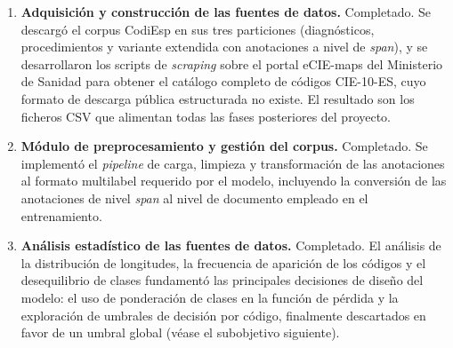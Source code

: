 \begin{enumerate}
 \item \textbf{Adquisición y construcción de las fuentes de datos.} Completado. Se descargó el corpus CodiEsp en sus tres particiones (diagnósticos, procedimientos y variante extendida con anotaciones a nivel de \emph{span}), y se desarrollaron los scripts de \emph{scraping} sobre el portal eCIE-maps del Ministerio de Sanidad para obtener el catálogo completo de códigos CIE-10-ES, cuyo formato de descarga pública estructurada no existe. El resultado son los ficheros CSV que alimentan todas las fases posteriores del proyecto.

 \item \textbf{Módulo de preprocesamiento y gestión del corpus.} Completado. Se implementó el \emph{pipeline} de carga, limpieza y transformación de las anotaciones al formato multilabel requerido por el modelo, incluyendo la conversión de las anotaciones de nivel \emph{span} al nivel de documento empleado en el entrenamiento.

 \item \textbf{Análisis estadístico de las fuentes de datos.} Completado. El análisis de la distribución de longitudes, la frecuencia de aparición de los códigos y el desequilibrio de clases fundamentó las principales decisiones de diseño del modelo: el uso de ponderación de clases en la función de pérdida y la exploración de umbrales de decisión por código, finalmente descartados en favor de un umbral global (véase el subobjetivo siguiente).


\end{enumerate}

